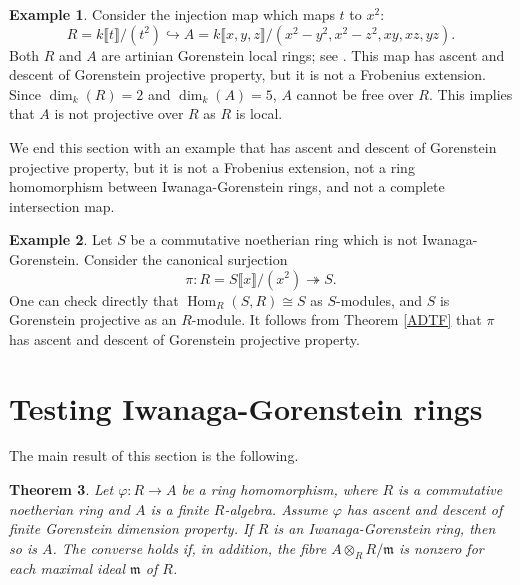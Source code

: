 \documentclass{amsart}
\newcommand{\0}{{\bf{0}}}
\newcommand{\m}{\mathfrak{m}}
\DeclareMathOperator{\Hom}{Hom}
\newtheorem{theorem}{Theorem}[section]
\theoremstyle{definition}
\newtheorem{example}[theorem]{Example}
\begin{document}
\begin{example}\label{converseFro}
Consider the injection map which maps $t$ to $x^2$:
$$R=k\llbracket t\rrbracket/(t^2)\hookrightarrow A=k\llbracket x,y,z\rrbracket/(x^2-y^2,x^2-z^2,xy,xz,yz).$$
Both $R$ and $A$ are artinian Gorenstein local rings; see \cite[Example 3.2.11]{BH}. This map has ascent and descent of Gorenstein projective property, but it is not a Frobenius extension. Since $\dim_k(R)=2$ and $\dim_k(A)=5$, $A$ cannot be free over $R$. This implies that $A$ is not projective over $R$ as $R$ is local.
\end{example}

We end this section with an example that has ascent and descent of Gorenstein projective property, but it is not a Frobenius extension, not a ring homomorphism between Iwanaga-Gorenstein rings, and not a complete intersection map.

\begin{example}\label{eg2}
Let $S$ be a commutative noetherian ring which is not Iwanaga-Gorenstein. Consider the canonical surjection
$$\pi\colon R=S\llbracket x\rrbracket/(x^2)\twoheadrightarrow S.$$
One can check directly that $\Hom_R(S,R)\cong S$ as $S$-modules, and $S$ is Gorenstein projective as an $R$-module. It follows from Theorem \ref{ADTF} that $\pi$ has ascent and descent of Gorenstein projective property.
\end{example}


\section{Testing Iwanaga-Gorenstein rings}\label{testsection}

The main result of this section is the following.
\begin{theorem}\label{ascentG}
Let $\varphi\colon R\rightarrow A$ be a ring homomorphism, where $R$ is a commutative noetherian ring and $A$ is a finite $R$-algebra. Assume $\varphi$ has ascent and descent of finite Gorenstein dimension property. If $R$ is an Iwanaga-Gorenstein ring, then so is $A$. The converse holds if, in addition, the fibre $A\otimes_R R/\m$ is nonzero for each maximal ideal $\m$ of $R$.
\end{theorem}
\end{document}
